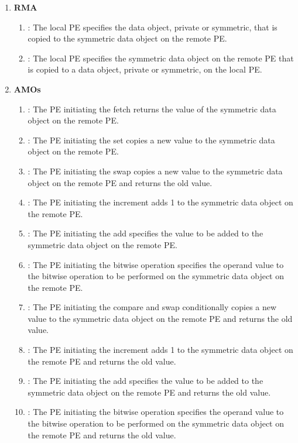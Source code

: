 \begin{enumerate}
\item \textbf{\acf{RMA}}
\begin{enumerate}
    \item \PUT: The local \ac{PE} specifies the \source{} data object, private
        or symmetric, that is copied to the symmetric data object on the remote
        \ac{PE}.
  \item \GET: The local \ac{PE} specifies the symmetric data object on the remote
      \ac{PE} that is copied to a data object, private or symmetric, on the local
      \ac{PE}.
\end{enumerate}

\item \textbf{\acfp{AMO}}
\begin{enumerate}
  \item {}: The \ac{PE} initiating the fetch returns the value of the
      symmetric data object on the remote \ac{PE}.
  \item {}: The \ac{PE} initiating the set copies a new value to the
      symmetric data object on the remote \ac{PE}.
  \item {}: The \ac{PE} initiating the swap copies a new value to the
      symmetric data object on the remote \ac{PE} and returns the old value.
  \item {}: The \ac{PE} initiating the increment adds 1 to the
      symmetric data object on the remote \ac{PE}.
  \item {}: The \ac{PE} initiating the add specifies the value to be added
      to the symmetric data object on the remote \ac{PE}.
  \item {}: The \ac{PE} initiating the bitwise
      operation specifies the operand value to the bitwise operation to be
      performed on the symmetric data object on the remote \ac{PE}.
  \item {}: The \ac{PE} initiating the compare and swap
      conditionally copies a new value to the symmetric data object on the
      remote \ac{PE} and returns the old value.
  \item {}: The \ac{PE} initiating the increment adds 1
      to the symmetric data object on the remote \ac{PE} and returns the old
      value.
  \item {}: The \ac{PE} initiating the add specifies the value to
      be added to the symmetric data object on the remote \ac{PE} and returns
      the old value.
  \item {}: The \ac{PE} initiating the bitwise
      operation specifies the operand value to the bitwise operation to be
      performed on the symmetric data object on the remote \ac{PE}
      and returns the old value.
\end{enumerate}


\end{enumerate}

